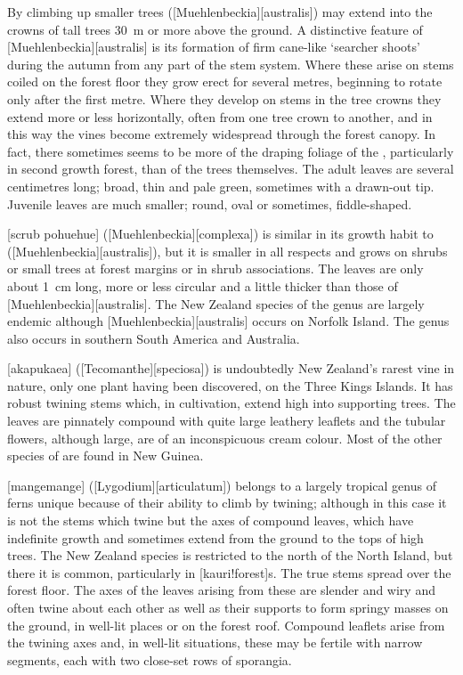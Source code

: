 By climbing up smaller trees  ([Muehlenbeckia][australis]) may extend into the crowns of tall trees \SI{30}{\metre} or more above the ground.
A distinctive feature of [Muehlenbeckia][australis] is its formation of firm cane-like `searcher shoots' during the autumn from any part of the stem system.
Where these arise on stems coiled on the forest floor they grow erect for several metres, beginning to rotate only after the first metre.
Where they develop on stems in the tree crowns they extend more or less horizontally, often from one tree crown to another, and in this way the vines become extremely widespread through the forest canopy.
In fact, there sometimes seems to be more of the draping foliage of the , particularly in second growth forest, than of the trees themselves.
The adult leaves are several centimetres long; broad, thin and pale green, sometimes with a drawn-out tip.
Juvenile leaves are much smaller; round, oval or sometimes, fiddle-shaped.

[scrub pohuehue] ([Muehlenbeckia][complexa]) is similar in its growth habit to  ([Muehlenbeckia][australis]), but it is smaller in all respects and grows on shrubs or small trees at forest margins or in shrub associations.
The leaves are only about \SI{1}{\centi\metre} long, more or less circular and a little thicker than those of [Muehlenbeckia][australis].
The New Zealand species of the genus are largely endemic although [Muehlenbeckia][australis] occurs on Norfolk Island.
The genus also occurs in southern South America and Australia.

[akapukaea] ([Tecomanthe][speciosa]) is undoubtedly New Zealand's rarest vine in nature, only one plant having been discovered, on the Three Kings Islands.
It has robust twining stems which, in cultivation, extend high into supporting trees.
The leaves are pinnately compound with quite large leathery leaflets and the tubular flowers, although large, are of an inconspicuous cream colour.
Most of the other species of  are found in New Guinea.

[mangemange] ([Lygodium][articulatum]) belongs to a largely tropical genus of ferns unique because of their ability to climb by twining; although in this case it is not the stems which twine but the axes of compound leaves, which have indefinite growth and sometimes extend from the ground to the tops of high trees.
The New Zealand species is restricted to the north of the North Island, but there it is common, particularly in [kauri!forest]s.
The true stems spread over the forest floor.
The axes of the leaves arising from these are slender and wiry and often twine about each other as well as their supports to form springy masses on the ground, in well-lit places or on the forest roof.
Compound leaflets arise from the twining axes and, in well-lit situations, these may be fertile with narrow segments, each with two close-set rows of sporangia.

